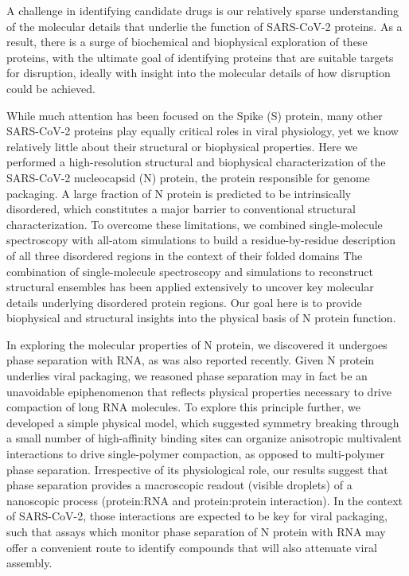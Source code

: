 \documentclass[../main.tex]{subfiles}
\begin{document}
        A challenge in identifying candidate drugs is our relatively sparse understanding of the molecular details that underlie the function of SARS-CoV-2 proteins. As a result, there is a surge of biochemical and biophysical exploration of these proteins, with the ultimate goal of identifying proteins that are suitable targets for disruption, ideally with insight into the molecular details of how disruption could be achieved\cite{Gordon2020-sg,Sanders2020-ea}.

        While much attention has been focused on the Spike (S) protein, many other SARS-CoV-2 proteins play equally critical roles in viral physiology, yet we know relatively little about their structural or biophysical properties\cite{Walls2020-of,Hoffmann2020-nt,Shang2020-er,Lan2020-wh}. Here we performed a high-resolution structural and biophysical characterization of the SARS-CoV-2 nucleocapsid (N) protein, the protein responsible for genome packaging\cite{masters_coronavirus_2019,Van_der_Lee2014-vc,Laude1995-bx}. A large fraction of N protein is predicted to be intrinsically disordered, which constitutes a major barrier to conventional structural characterization\cite{Van_der_Lee2014-vc}. To overcome these limitations, we combined single-molecule spectroscopy with all-atom simulations to build a residue-by-residue description of all three disordered regions in the context of their folded domains The combination of single-molecule spectroscopy and simulations to reconstruct structural ensembles has been applied extensively to uncover key molecular details underlying disordered protein regions\cite{Holmstrom2019-ns,Borgia2018-yo,Dimura2016-kt,Fuertes2017-au,Warner2017-zh,Chung2015-uh}. Our goal here is to provide biophysical and structural insights into the physical basis of N protein function.

        In exploring the molecular properties of N protein, we discovered it undergoes phase separation with RNA, as was also reported recently\cite{Iserman2020-xm,Perdikari2020-cx,Savastano2020-zf}. Given N protein underlies viral packaging, we reasoned phase separation may in fact be an unavoidable epiphenomenon that reflects physical properties necessary to drive compaction of long RNA molecules. To explore this principle further, we developed a simple physical model, which suggested symmetry breaking through a small number of high-affinity binding sites can organize anisotropic multivalent interactions to drive single-polymer compaction, as opposed to multi-polymer phase separation. Irrespective of its physiological role, our results suggest that phase separation provides a macroscopic readout (visible droplets) of a nanoscopic process (protein:RNA and protein:protein interaction). In the context of SARS-CoV-2, those interactions are expected to be key for viral packaging, such that assays which monitor phase separation of N protein with RNA may offer a convenient route to identify compounds that will also attenuate viral assembly.
\end{document}
